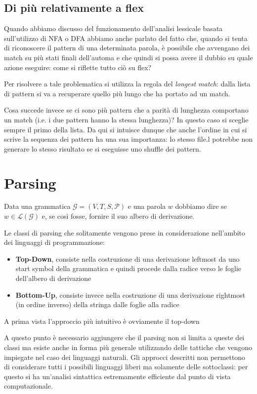 \documentclass[class=book, crop=false, oneside, 12pt]{standalone}
\begin{document}
\subsection{Di più relativamente a flex}
Quando abbiamo discusso del funzionamento dell'analisi lessicale basata sull'utilizzo di NFA o DFA abbiamo anche parlato del fatto che, quando si tenta di riconoscere il pattern di una determinata parola, è possibile che avvengano dei match su più stati finali dell'automa e che quindi si possa avere il dubbio su quale azione eseguire: come si riflette tutto ciò su flex? 

Per risolvere a tale problematica si utilizza la regola del \emph{longest match}: dalla lista di pattern si va a recuperare quello più lungo che ha portato ad un match.

Cosa succede invece se ci sono più pattern che a parità di lunghezza comportano un match (i.e. i due pattern hanno la stessa lunghezza)? In questo caso si sceglie sempre il primo della lista. Da qui si intuisce dunque che anche l'ordine in cui si scrive la sequenza dei pattern ha una sua importanza: lo stesso file.l potrebbe non generare lo stesso risultato se si eseguisse uno shuffle dei pattern.

\section{Parsing}
Data una grammatica \(\mathcal{G} = (V, T, S, \mathcal{P})\) e una parola \(w\) dobbiamo dire se \(w \in \mathcal{L(G)}\) e, se così fosse, fornire il suo albero di derivazione.

Le classi di parsing che solitamente vengono prese in considerazione nell'ambito dei linguaggi di programmazione: 

\begin{itemize}
    \item \textbf{Top-Down}, consiste nella costruzione di una derivazione leftmost da uno start symbol della grammatica e quindi procede dalla radice verso le foglie dell'albero di derivazione
    \item \textbf{Bottom-Up}, consiste invece nella costruzione di una derivazione rightmost (in ordine inverso) della stringa dalle foglie alla radice
\end{itemize}

A prima vista l'approccio più intuitivo è ovviamente il top-down

A questo punto è necessario aggiungere che il parsing non si limita a queste dei classi ma esiste anche in forma più generale utilizzando delle tattiche che vengono impiegate nel caso dei linguaggi naturali. Gli approcci descritti non permettono di considerare tutti i possibili linguaggi liberi ma solamente delle sottoclassi: per questo si ha un'analisi sintattica estremamente efficiente dal punto di vista computazionale.
\end{document}

